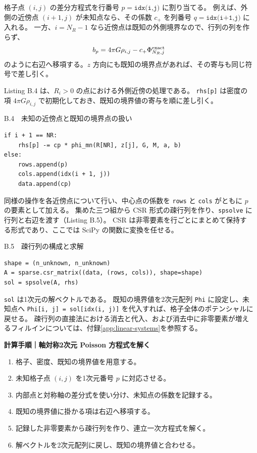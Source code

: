 格子点 $(i,j)$ の差分方程式を行番号 $p=\texttt{idx(i,j)}$ に割り当てる。
例えば、外側の近傍点 $(i+1,j)$ が未知点なら、その係数 $c_+$ を列番号 $q=\texttt{idx(i+1,j)}$ に入れる。
一方、$i=N_R-1$ なら近傍点は既知の外側境界なので、行列の列を作らず、
\begin{equation}
 b_p=4\pi G\rho_{i,j}-c_+\Phi_{N_R,j}^{\rm exact}
\label{eq:appB-boundary-rhs}
\end{equation}
のように右辺へ移項する。$z$ 方向にも既知の境界点があれば、その寄与も同じ符号で差し引く。

Listing B.4 は、$R_i>0$ の点における外側近傍の処理である。
\texttt{rhs[p]} は密度の項 $4\pi G\rho_{i,j}$ で初期化しておき、既知の境界値の寄与を順に差し引く。

\begin{listingbox}{B.4　未知の近傍点と既知の境界点の扱い}
\begin{Verbatim}[fontsize=\small]
if i + 1 == NR:
    rhs[p] -= cp * phi_mn(R[NR], z[j], G, M, a, b)
else:
    rows.append(p)
    cols.append(idx(i + 1, j))
    data.append(cp)
\end{Verbatim}
\end{listingbox}

同様の操作を各近傍点について行い、中心点の係数を \texttt{rows} と \texttt{cols} がともに $p$ の要素として加える。
集めた三つ組から CSR 形式の疎行列を作り、\texttt{spsolve} に行列と右辺を渡す（Listing B.5）。
CSR は非零要素を行ごとにまとめて保持する形式であり、ここでは SciPy の関数に変換を任せる\cite{kouya2021}。

\begin{listingbox}{B.5　疎行列の構成と求解}
\begin{Verbatim}[fontsize=\small]
shape = (n_unknown, n_unknown)
A = sparse.csr_matrix((data, (rows, cols)), shape=shape)
sol = spsolve(A, rhs)
\end{Verbatim}
\end{listingbox}

\texttt{sol} は1次元の解ベクトルである。
既知の境界値を2次元配列 \texttt{Phi} に設定し、未知点へ \texttt{Phi[i, j] = sol[idx(i, j)]} を代入すれば、格子全体のポテンシャルに戻せる。
疎行列の直接法における消去と代入、および消去中に非零要素が増えるフィルインについては、付録\ref{app:linear-systems}を参照する。

\medskip
\noindent\textbf{計算手順｜軸対称2次元 Poisson 方程式を解く}
\par\smallskip
\begin{enumerate}[itemsep=0em,topsep=0.1em]
\item 格子、密度、既知の境界値を用意する。
\item 未知格子点 $(i,j)$ を1次元番号 $p$ に対応させる。
\item 内部点と対称軸の差分式を使い分け、未知点の係数を記録する。
\item 既知の境界値に掛かる項は右辺へ移項する。
\item 記録した非零要素から疎行列を作り、連立一次方程式を解く。
\item 解ベクトルを2次元配列に戻し、既知の境界値と合わせる。
\end{enumerate}

